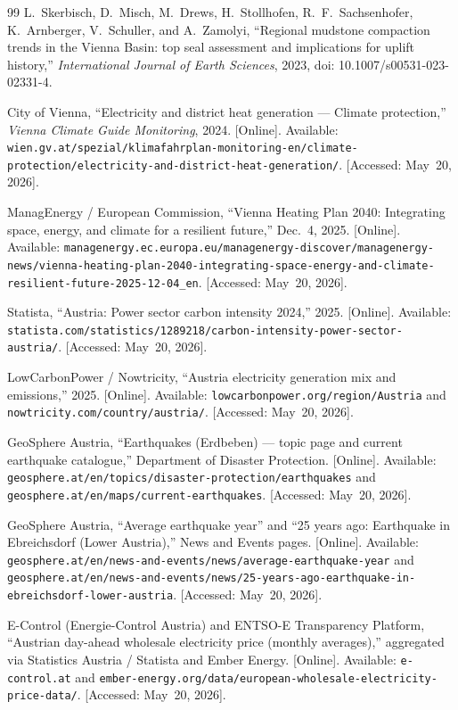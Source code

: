 \documentclass{article}
\begin{document}
\begin{thebibliography}{99}
L.~Skerbisch, D.~Misch, M.~Drews, H.~Stollhofen, R.~F.~Sachsenhofer,
K.~Arnberger, V.~Schuller, and A.~Zamolyi, ``Regional mudstone compaction
trends in the Vienna Basin: top seal assessment and implications for uplift
history,'' \emph{International Journal of Earth Sciences}, 2023, doi:
10.1007/s00531-023-02331-4.

City of Vienna, ``Electricity and district heat generation --- Climate
protection,'' \emph{Vienna Climate Guide Monitoring}, 2024. [Online].
Available:
\texttt{wien.gv.at/spezial/klimafahrplan-monitoring-en/climate-protection/electricity-and-district-heat-generation/}.
[Accessed: May~20, 2026].

ManagEnergy / European Commission, ``Vienna Heating Plan 2040: Integrating
space, energy, and climate for a resilient future,'' Dec.\ 4, 2025.
[Online]. Available:
\texttt{managenergy.ec.europa.eu/managenergy-discover/managenergy-news/vienna-heating-plan-2040-integrating-space-energy-and-climate-resilient-future-2025-12-04\_en}.
[Accessed: May~20, 2026].

Statista, ``Austria: Power sector carbon intensity 2024,'' 2025. [Online].
Available: \texttt{statista.com/statistics/1289218/carbon-intensity-power-sector-austria/}.
[Accessed: May~20, 2026].

LowCarbonPower / Nowtricity, ``Austria electricity generation mix and
emissions,'' 2025. [Online]. Available:
\texttt{lowcarbonpower.org/region/Austria} and
\texttt{nowtricity.com/country/austria/}. [Accessed: May~20, 2026].

GeoSphere Austria, ``Earthquakes (Erdbeben) --- topic page and current
earthquake catalogue,'' Department of Disaster Protection. [Online].
Available: \texttt{geosphere.at/en/topics/disaster-protection/earthquakes}
and \texttt{geosphere.at/en/maps/current-earthquakes}.
[Accessed: May~20, 2026].

GeoSphere Austria, ``Average earthquake year''
and ``25 years ago: Earthquake in Ebreichsdorf (Lower Austria),'' News
and Events pages. [Online]. Available:
\texttt{geosphere.at/en/news-and-events/news/average-earthquake-year} and
\texttt{geosphere.at/en/news-and-events/news/25-years-ago-earthquake-in-ebreichsdorf-lower-austria}.
[Accessed: May~20, 2026].

E-Control (Energie-Control Austria) and ENTSO-E Transparency Platform,
``Austrian day-ahead wholesale electricity price (monthly averages),''
aggregated via Statistics Austria / Statista and Ember Energy. [Online].
Available: \texttt{e-control.at} and
\texttt{ember-energy.org/data/european-wholesale-electricity-price-data/}.
[Accessed: May~20, 2026].


\end{thebibliography}
\end{document}

